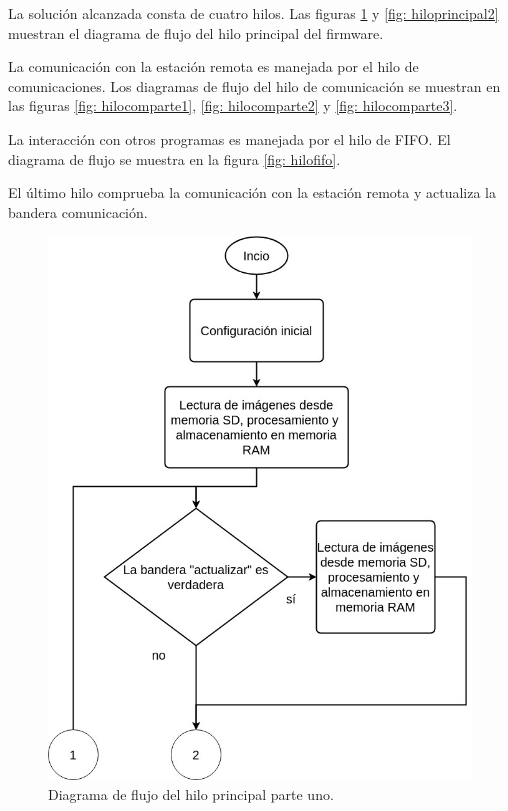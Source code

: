 La solución alcanzada consta de cuatro hilos. Las figuras \ref{fig: hiloprincipal1} y \ref{fig: hiloprincipal2} muestran el diagrama de flujo del hilo principal del firmware. 

La comunicación con la estación remota es manejada por el hilo de comunicaciones. Los diagramas de flujo del hilo de comunicación se muestran en las figuras \ref{fig: hilocomparte1}, \ref{fig: hilocomparte2} y \ref{fig: hilocomparte3}.

La interacción con otros programas es manejada por el hilo de FIFO. El diagrama de flujo se muestra en la figura \ref{fig: hilofifo}.

El último hilo comprueba la comunicación con la estación remota y actualiza la bandera comunicación.

\begin{figure}[htpb]
	\centering
	\includegraphics[scale=0.6]{Figures/hilo1parte1.jpg} 
	\caption{Diagrama de flujo del hilo principal parte uno.}
	\label{fig: hiloprincipal1}
\end{figure}
